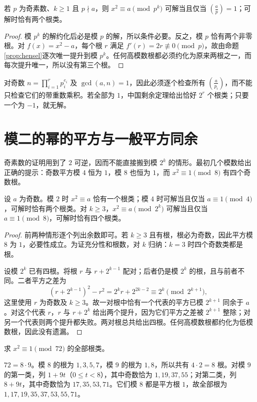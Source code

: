 \documentclass[UTF8,12pt,a4paper,fontset=fandol]{ctexbook}
\begin{document}
\begin{proposition}[奇素数幂上的可逆平方]
\label{prop:odd-prime-square-roots}
若 $p$ 为奇素数、$k\ge1$ 且 $p\nmid a$，则 $x^2\equiv a\pmod{p^k}$ 可解当且仅当 $\left(\frac ap\right)=1$；可解时恰有两个根类。
\end{proposition}
\begin{proof}
模 $p^k$ 的解约化后必是模 $p$ 的解，所以条件必要。反之，模 $p$ 恰有两个非零根。对 $f(x)=x^2-a$，每个根 $r$ 满足 $f'(r)=2r\not\equiv0\pmod p$，故由命题\ref{prop:hensel}逐次唯一提升到模 $p^k$。任何高模数根都必须约化为原来两根之一，而每次提升唯一，所以没有第三个根。
\end{proof}

对奇数 $n=\prod_{i=1}^r p_i^{e_i}$ 及 $\gcd(a,n)=1$，因此必须逐个检查所有 $\left(\frac a{p_i}\right)$，而不能只检查它们的带重数乘积。若全部为 $1$，中国剩余定理给出恰好 $2^r$ 个根类；只要一个为 $-1$，就无解。

\section{模二的幂的平方与一般平方同余}

奇素数的证明用到了 $2$ 可逆，因而不能直接搬到模 $2^k$ 的情形。最初几个模数给出正确的提示：奇数平方模 $4$ 恒为 $1$，模 $8$ 也恒为 $1$，而 $x^2\equiv1\pmod8$ 有四个奇数根。

\begin{proposition}
\label{prop:two-power-squares}
设 $a$ 为奇数。模 $2$ 时 $x^2\equiv a$ 恰有一个根类；模 $4$ 时可解当且仅当 $a\equiv1\pmod4$，可解时恰有两个根类。对 $k\ge3$，$x^2\equiv a\pmod{2^k}$ 可解当且仅当 $a\equiv1\pmod8$，可解时恰有四个根类。
\end{proposition}
\begin{proof}
前两种情形逐个列出余数即可。若 $k\ge3$ 且有根，根必为奇数，因此平方模 $8$ 为 $1$，必要性成立。为证充分性和根数，对 $k$ 归纳：$k=3$ 时四个奇数类都是根。

设模 $2^k$ 已有四根。将根 $r$ 与 $r+2^{k-1}$ 配对；后者仍是模 $2^k$ 的根，且与前者不同。二者平方之差为
\[
 (r+2^{k-1})^2-r^2=2^kr+2^{2k-2}\equiv2^k\pmod{2^{k+1}},
\]
这里使用 $r$ 为奇数及 $k\ge3$。故一对根中恰有一个代表的平方已模 $2^{k+1}$ 同余于 $a$。对这个代表 $r$，$r$ 与 $r+2^k$ 给出两个提升，因为它们平方之差被 $2^{k+1}$ 整除；对另一个代表则两个提升都失败。两对根总共给出四根。任何高模数根都约化为低模数根，因此没有遗漏。
\end{proof}

\begin{example}[把奇素数幂与二的幂合并]
求 $x^2\equiv1\pmod{72}$ 的全部根类。
\end{example}
\begin{solve}
$72=8\cdot9$。模 $8$ 的根为 $1,3,5,7$，模 $9$ 的根为 $1,8$，所以共有 $4\cdot2=8$ 根。对模 $9$ 的第一类，列 $1+9t$（$0\le t<8$），其中奇数恰为 $1,19,37,55$；对第二类，列 $8+9t$，其中奇数恰为 $17,35,53,71$。它们模 $8$ 都是平方根 $1$，故全部根为 $1,17,19,35,37,53,55,71$。
\end{solve}
\end{document}
